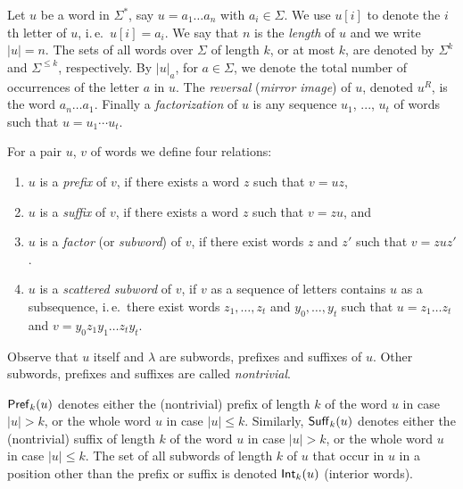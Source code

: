 Let $u$ be a word in $\Sigma^*$, say $u = a_1 \ldots a_n$ with $a_i \in \Sigma$. We use $u[i]$ to denote the $i$th letter of $u$, i.\,e.\ $u[i] = a_i$. We say that $n$ is the \emph{length} of $u$ and we write $|u|=n$. The sets of all words over $\Sigma$ of length $k$, or at most $k$, are denoted by $\Sigma^k$ and $\Sigma^{\le k}$, respectively. By $|u|_a$, for $a \in \Sigma$, we denote the total number of occurrences of the letter $a$ in $u$. The \emph{reversal} (\emph{mirror image}) of $u$, denoted $u^R$, is the word $a_n \ldots a_1$. Finally a \emph{factorization} of $u$ is any sequence $u_1$, ..., $u_t$ of words such that $u = u_1 \cdots u_t$.

For a pair $u$, $v$ of words we define four relations:

\begin{enumerate}
\item $u$ is a \emph{prefix} of $v$, if there exists a word $z$ such that $v = uz$,
\item $u$ is a \emph{suffix} of $v$, if there exists a word $z$ such that $v = zu$, and
\item $u$ is a \emph{factor} (or \emph{subword}) of $v$, if there exist words $z$ and $z'$ such that $v = zuz'$.
\item $u$ is a \emph{scattered subword} of $v$, if $v$ as a sequence of letters contains $u$ as a subsequence, i.\,e.\ there exist words $z_1, \ldots, z_t$ and $y_0, \ldots, y_t$ such that $u = z_1 \ldots z_t$ and $v = y_0 z_1 y_1 \ldots z_t y_t$.
\end{enumerate}

Observe that $u$ itself and $\lambda$ are subwords, prefixes and suffixes of $u$. Other subwords, prefixes and suffixes are called \emph{nontrivial}.

$\textup{\sf Pref\/}_k(u)$ denotes either the (nontrivial) prefix of length $k$ of the word $u$ in case $|u|>k$, or the whole word $u$ in case $|u|\le k$. Similarly, $\textup{\sf Suff\/}_k(u)$ denotes either the (nontrivial) suffix of length $k$ of the word $u$ in case $|u|>k$, or the whole word $u$ in case $|u|\le k$. The set of all subwords of length $k$ of $u$ that occur in $u$ in a position other than the prefix or suffix is denoted $\textup{\sf Int\/}_k(u)$ (interior words).


